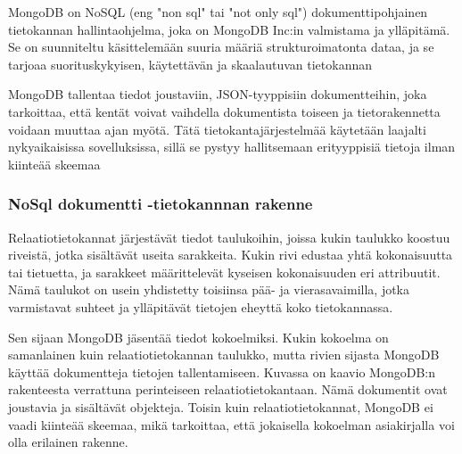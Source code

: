 












MongoDB on NoSQL (eng "non sql"{} tai "not only sql"{}) dokumenttipohjainen tietokannan hallintaohjelma,
joka on MongoDB Inc:in valmistama ja ylläpitämä.
Se on suunniteltu käsittelemään suuria määriä strukturoimatonta dataa,
ja se tarjoaa suorituskykyisen, käytettävän ja skaalautuvan tietokannan
\medskip




MongoDB tallentaa tiedot joustaviin, JSON-tyyppisiin dokumentteihin, 
joka tarkoittaa, että kentät voivat vaihdella dokumentista toiseen ja tietorakennetta voidaan muuttaa ajan myötä. 
Tätä tietokantajärjestelmää käytetään laajalti nykyaikaisissa sovelluksissa, 
sillä se pystyy hallitsemaan erityyppisiä tietoja ilman kiinteää skeemaa
\medskip



\subsubsection{NoSql dokumentti -tietokannnan rakenne}




Relaatiotietokannat järjestävät tiedot taulukoihin,
joissa kukin taulukko koostuu riveistä, jotka sisältävät useita sarakkeita.
Kukin rivi edustaa yhtä kokonaisuutta tai tietuetta, ja sarakkeet määrittelevät kyseisen kokonaisuuden eri attribuutit.
Nämä taulukot on usein yhdistetty toisiinsa pää- ja vierasavaimilla,
jotka varmistavat suhteet ja ylläpitävät tietojen eheyttä koko tietokannassa.
\medskip

Sen sijaan MongoDB jäsentää tiedot kokoelmiksi.
Kukin kokoelma on samanlainen kuin relaatiotietokannan taulukko,
mutta rivien sijasta MongoDB käyttää dokumentteja tietojen tallentamiseen.
Kuvassa \nextImageCount{} on kaavio MongoDB:n rakenteesta verrattuna perinteiseen relaatiotietokantaan. 
Nämä dokumentit ovat joustavia ja sisältävät objekteja.
Toisin kuin relaatiotietokannat, MongoDB ei vaadi kiinteää skeemaa, mikä tarkoittaa, 
että jokaisella kokoelman asiakirjalla voi olla erilainen rakenne.
\medskip

